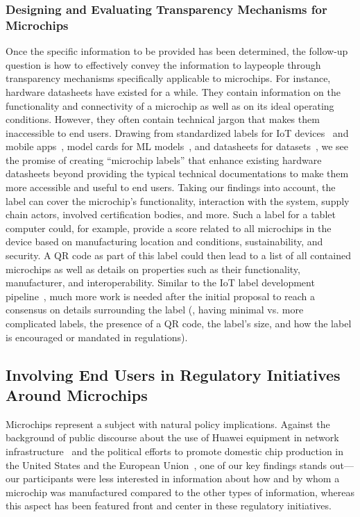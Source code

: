 \subsubsection{Designing and Evaluating Transparency Mechanisms for Microchips}
Once the specific information to be provided has been determined, the follow-up question is how to effectively convey the information to laypeople through transparency mechanisms specifically applicable to microchips.
For instance, hardware datasheets have existed for a while. 
They contain information on the functionality and connectivity of a microchip as well as on its ideal operating conditions. 
However, they often contain technical jargon that makes them inaccessible to end users.
Drawing from standardized labels for \acs{IoT} devices~\cite{emami2020ask} and mobile apps~\cite{Cranor2022Mobile}, model cards for ML models~\cite{DBLP:conf/fat/MitchellWZBVHSR19}, and datasheets for datasets~\cite{DBLP:journals/cacm/GebruMVVWDC21}, we see the promise of creating \enquote{microchip labels} that enhance existing hardware datasheets beyond providing the typical technical documentations to make them more accessible and useful to end users. 
Taking our findings into account, the label can cover the microchip's functionality, interaction with the system, supply chain actors, involved certification bodies, and more. 
Such a label for a tablet computer could, for example, provide a score related to all microchips in the device based on manufacturing location and conditions, sustainability, and security. 
A QR code as part of this label could then lead to a list of all contained microchips as well as details on properties such as their functionality, manufacturer, and interoperability.
Similar to the IoT label development pipeline~\cite{DBLP:journals/cacm/CranorAN24}, much more work is needed after the initial proposal to reach a consensus on details surrounding the label (\eg, having minimal vs. more complicated labels, the presence of a QR code, the label's size, and how the label is encouraged or mandated in regulations). 



\subsection{Involving End Users in Regulatory Initiatives Around Microchips}
\label{sec:policy:implications}
Microchips represent a subject with natural policy implications. 
Against the background of public discourse about the use of Huawei equipment in network infrastructure~\cite{Webster2019} and the political efforts to promote domestic chip production in the United States and the European Union~\cite{euchips2022,uschips2022}, one of our key findings stands out---our participants were less interested in information about how and by whom a microchip was manufactured compared to the other types of information, whereas this aspect has been featured front and center in these regulatory initiatives.

